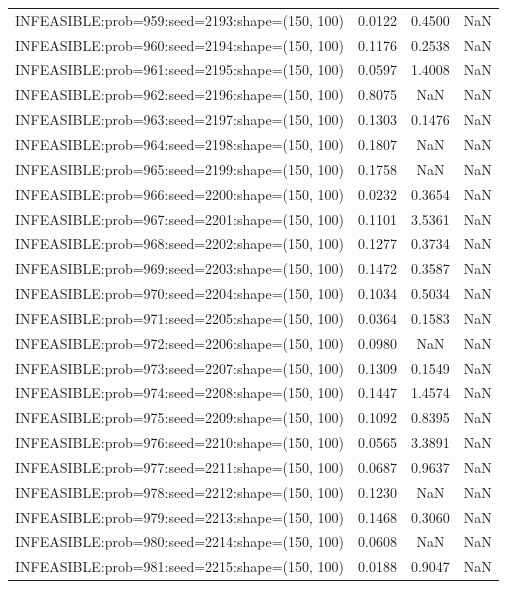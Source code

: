 \begin{longtable}{lccc}
INFEASIBLE:prob=959:seed=2193:shape=(150, 100) & 0.0122 &  0.4500 &    NaN \\
INFEASIBLE:prob=960:seed=2194:shape=(150, 100) & 0.1176 &  0.2538 &    NaN \\
INFEASIBLE:prob=961:seed=2195:shape=(150, 100) & 0.0597 &  1.4008 &    NaN \\
INFEASIBLE:prob=962:seed=2196:shape=(150, 100) & 0.8075 &     NaN &    NaN \\
INFEASIBLE:prob=963:seed=2197:shape=(150, 100) & 0.1303 &  0.1476 &    NaN \\
INFEASIBLE:prob=964:seed=2198:shape=(150, 100) & 0.1807 &     NaN &    NaN \\
INFEASIBLE:prob=965:seed=2199:shape=(150, 100) & 0.1758 &     NaN &    NaN \\
INFEASIBLE:prob=966:seed=2200:shape=(150, 100) & 0.0232 &  0.3654 &    NaN \\
INFEASIBLE:prob=967:seed=2201:shape=(150, 100) & 0.1101 &  3.5361 &    NaN \\
INFEASIBLE:prob=968:seed=2202:shape=(150, 100) & 0.1277 &  0.3734 &    NaN \\
INFEASIBLE:prob=969:seed=2203:shape=(150, 100) & 0.1472 &  0.3587 &    NaN \\
INFEASIBLE:prob=970:seed=2204:shape=(150, 100) & 0.1034 &  0.5034 &    NaN \\
INFEASIBLE:prob=971:seed=2205:shape=(150, 100) & 0.0364 &  0.1583 &    NaN \\
INFEASIBLE:prob=972:seed=2206:shape=(150, 100) & 0.0980 &     NaN &    NaN \\
INFEASIBLE:prob=973:seed=2207:shape=(150, 100) & 0.1309 &  0.1549 &    NaN \\
INFEASIBLE:prob=974:seed=2208:shape=(150, 100) & 0.1447 &  1.4574 &    NaN \\
INFEASIBLE:prob=975:seed=2209:shape=(150, 100) & 0.1092 &  0.8395 &    NaN \\
INFEASIBLE:prob=976:seed=2210:shape=(150, 100) & 0.0565 &  3.3891 &    NaN \\
INFEASIBLE:prob=977:seed=2211:shape=(150, 100) & 0.0687 &  0.9637 &    NaN \\
INFEASIBLE:prob=978:seed=2212:shape=(150, 100) & 0.1230 &     NaN &    NaN \\
INFEASIBLE:prob=979:seed=2213:shape=(150, 100) & 0.1468 &  0.3060 &    NaN \\
INFEASIBLE:prob=980:seed=2214:shape=(150, 100) & 0.0608 &     NaN &    NaN \\
INFEASIBLE:prob=981:seed=2215:shape=(150, 100) & 0.0188 &  0.9047 &    NaN \\

\end{longtable}
